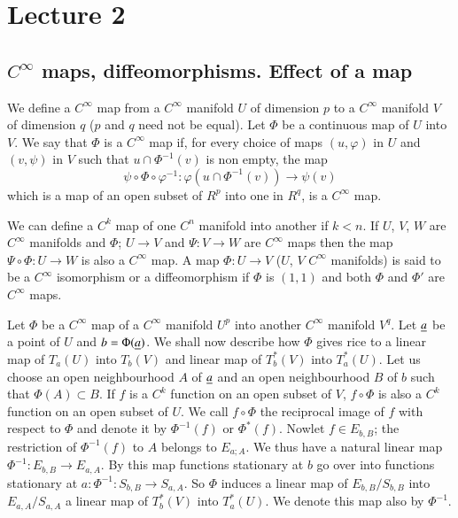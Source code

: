 \chapter{Lecture 2}

\section*{$C^{\infty}$ maps, diffeomorphisms. Effect of a
  map}\pageoriginale 

We define a $C^{\infty}$ map from a $C^{\infty}$ manifold $U$ of
dimension $p$ to a $C^{\infty}$ manifold $V$ of dimension $q$ ($p$ and
$q$ need not be equal). Let $\Phi$ be a continuous map of $U$ into
$V$. We say that $\Phi$ is a $C^{\infty}$ map if, for every choice of
maps $(u,\varphi)$ in $U$ and $(v,\psi)$ in $V$ such that $u\cap
\Phi^{-1}(v)$ is non empty, the map
$$
\psi\circ \Phi\circ \varphi^{-1}:\varphi(u\cap \Phi^{-1}(v))\to
\psi(v)
$$
which is a map of an open subset of $R^{p}$ into one in $R^{q}$, is a
$C^{\infty}$ map.

We can define a $C^{k}$ map of one $C^{n}$ manifold into another if
$k<n$. If $U$, $V$, $W$ are $C^{\infty}$ manifolds and $\Phi$; $U\to
V$ and $\Psi:V\to W$ are $C^{\infty}$ maps then the map $\Psi\circ
\Phi:U\to W$ is also a $C^{\infty}$ map. A map $\Phi:U\to V$ ($U$, $V$
$C^{\infty}$ manifolds) is said to be a $C^{\infty}$ isomorphism or a
diffeomorphism if $\Phi$ is $(1,1)$ and both $\Phi$ and $\Phi'$ are
$C^{\infty}$ maps.

Let $\Phi$ be a $C^{\infty}$ map of a $C^{\infty}$ manifold $U^{p}$
into another $C^{\infty}$ manifold $V^{q}$. Let $\underline{a}$ be a point of
$U$ and $b=\Phi(\underline{a})$. We shall now describe how $\Phi$ gives rice
to a linear map of $T_{a}(U)$ into $T_{b}(V)$ and linear map of
$T^{\ast}_{b}(V)$ into $T^{\ast}_{a}(U)$. Let us choose an open
neighbourhood $A$ of $\underline{a}$ and an open neighbourhood $B$ of $b$
such that $\Phi(A)\subset B$. If $f$ is a $C^{k}$ function on an open
subset of $V$, $f\circ\Phi$ is also a $C^{k}$ function on an open
subset of $U$. We call $f\circ \Phi$ the reciprocal image of $f$ with
respect to $\Phi$ and denote it by $\Phi^{-1}(f)$ or
$\Phi^{\ast}(f)$. Now\pageoriginale let $f\in E_{b,B}$; the
restriction of $\Phi^{-1}(f)$ to $A$ belongs to $E_{a;A}$. We thus
have a natural linear map $\Phi^{-1}:E_{b,B}\to E_{a,A}$. By this map
functions stationary at $b$ go over into functions stationary at
$a:\Phi^{-1}:S_{b,B}\to S_{a,A}$. So $\Phi$ induces a linear map of
$E_{b,B}/S_{b,B}$ into $E_{a,A}/S_{a,A}$ \iec a linear map of
$T^{\ast}_{b}(V)$ into $T^{\ast}_{a}(U)$. We denote this map also by
$\Phi^{-1}$. 

